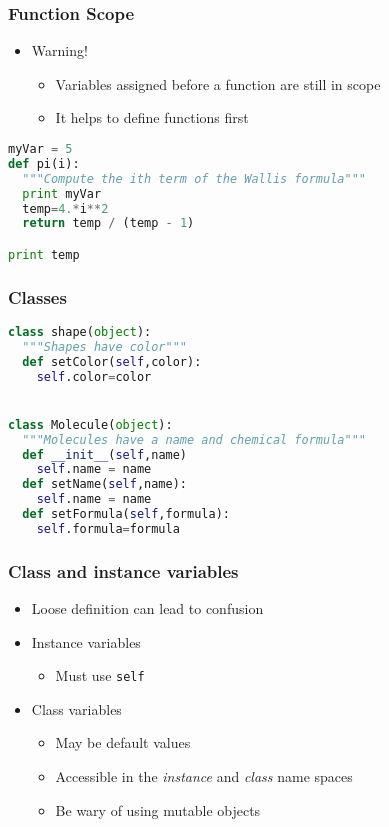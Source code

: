 \documentclass[xcolor=table,10pt,final]{beamer}
\begin{document}
\begin{frame}[fragile]
  \frametitle{Function Scope}
  \begin{itemize}
    \item Warning!
      \begin{itemize}
        \item Variables assigned before a function are still in scope
        \item It helps to define functions first
      \end{itemize}
  \end{itemize}
\begin{lstlisting}[language=Python]
myVar = 5
def pi(i):
  """Compute the ith term of the Wallis formula"""
  print myVar
  temp=4.*i**2
  return temp / (temp - 1)

print temp
\end{lstlisting}
\end{frame}

\begin{frame}[fragile]
  \frametitle{Classes}
  \begin{lstlisting}[language=Python]
class shape(object):
  """Shapes have color"""
  def setColor(self,color):
    self.color=color


class Molecule(object):
  """Molecules have a name and chemical formula"""
  def __init__(self,name)
    self.name = name
  def setName(self,name):
    self.name = name
  def setFormula(self,formula):
    self.formula=formula
\end{lstlisting}
\end{frame}

\begin{frame}
  \frametitle{Class and instance variables}
  \begin{itemize}
    \item Loose definition can lead to confusion
    \item Instance variables
      \begin{itemize}
        \item Must use {\tt self}
      \end{itemize}
    \item Class variables
      \begin{itemize}
        \item May be default values
        \item Accessible in the {\it instance} and {\it class} name spaces
        \item Be wary of using mutable objects
      \end{itemize}
  \end{itemize}
\end{frame}
\end{document}
